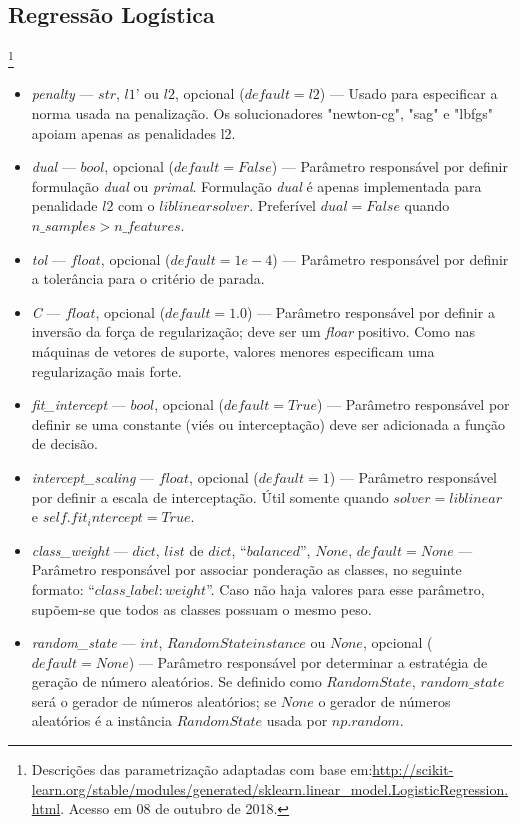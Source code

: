 \documentclass[
	12pt,				%
	oneside,			%
	a4paper,			%
	english,			%
	brazil				%
	]{abntex2ppgsi}
\begin{document}
{{{\begin{apendicesenv}
\section{Regressão Logística}\footnote{Descrições das parametrização adaptadas com base em:\url{http://scikit-learn.org/stable/modules/generated/sklearn.linear_model.LogisticRegression.html}. Acesso em 08 de outubro de 2018.}
\begin{itemize}
\item \textit{penalty} --- $str$, $l1’$ ou $l2$, opcional ($default=l2$) --- Usado para especificar a norma usada na penalização. Os solucionadores "newton-cg", "sag" e "lbfgs" apoiam apenas as penalidades l2.
\item \textit{dual} --- $bool$, opcional ($default=False$) --- Parâmetro responsável por definir formulação \textit{dual} ou \textit{primal}. Formulação \textit{dual} é apenas implementada para penalidade $l2$ com o $liblinear solver$. Preferível $dual=False$ quando $n\_samples > n\_features$.
\item \textit{tol} --- $float$, opcional ($default=1e-4$) --- Parâmetro responsável por definir a tolerância para o critério de parada.
\item \textit{C}  --- $float$, opcional ($default=1.0$) --- Parâmetro responsável por definir a inversão da força de regularização; deve ser um \textit{floar} positivo. Como nas máquinas de vetores de suporte, valores menores especificam uma regularização mais forte.
\item \textit{fit\_intercept} --- $bool$, opcional ($default=True$) --- Parâmetro responsável por definir se uma constante (viés ou interceptação) deve ser adicionada a função de decisão.
\item \textit{intercept\_scaling} --- $float$, opcional ($default=1$) --- Parâmetro responsável por definir a escala de interceptação. Útil somente quando $solver=liblinear$ e $self.fit_intercept=True$.
\item \textit{class\_weight} --- $dict$, $list$ de $dict$, ``$balanced$'', $None$, $default=None$ --- Parâmetro responsável por associar ponderação as classes, no seguinte formato: ``${class\_label: weight}$''. Caso não haja valores para esse parâmetro, supõem-se que todos as classes possuam o mesmo peso. 
\item \textit{random\_state} --- $int$, $RandomState instance$ ou $None$, opcional ($default=None$) --- Parâmetro responsável por determinar a estratégia de geração de número aleatórios. Se definido como $RandomState$, $random\_state$ será o gerador de números aleatórios; se $None$ o gerador de números aleatórios é a instância $RandomState$ usada por $np.random$.

\end{itemize}
\end{apendicesenv}}}}
\end{document}
